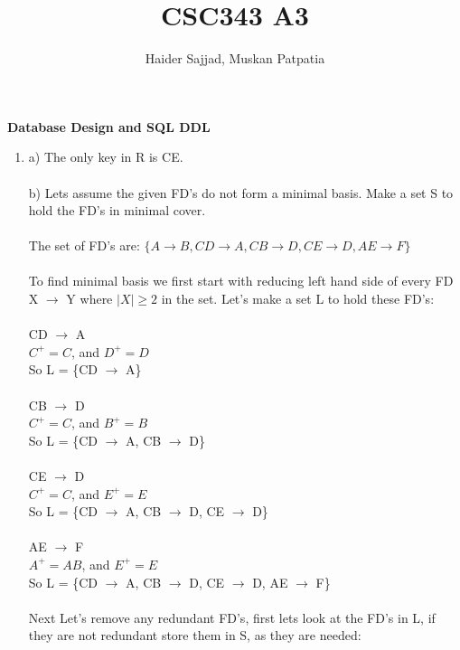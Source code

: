 \documentclass{article}
\begin{document}
\title{CSC343 A3}
\author{Haider Sajjad, Muskan Patpatia}
\maketitle

\begin{LARGE}
\textbf{Database Design and SQL DDL}
\end{LARGE}



\begin{enumerate}
    \item %
    a)
    The only key in R is CE.
       \\ \\
    b)
    Lets assume the given FD’s do not form a minimal basis. Make a set S to hold the FD's in minimal cover.
    \\ \\
    The set of FD's are: 
    $\{A\rightarrow B, CD\rightarrow A, CB\rightarrow D, CE\rightarrow D, AE\rightarrow F \}$
    \\  \\
    To find minimal basis we first start with 
    reducing left hand side of every FD X $\rightarrow$ Y where $|X|\geq 2$ in the set. Let's make a set L to hold these FD's:
    \\
    \\
    CD $\rightarrow$ A\\
    $C^{+}=C$, and $D^{+}=D$\\
    So L = \{CD $\rightarrow$ A\}
    \\
    \\
    CB $\rightarrow$ D\\
    $C^{+}=C$, and $B^{+}=B$\\
    So L = \{CD $\rightarrow$ A, CB $\rightarrow$ D\}\\\\
    CE $\rightarrow$ D\\
    $C^{+}=C$, and $E^{+}=E$\\
    So L = \{CD $\rightarrow$ A, CB $\rightarrow$ D, CE $\rightarrow$ D\}\\\\
    AE $\rightarrow$ F\\
    $A^{+}=AB$, and $E^{+}=E$\\
    So L = \{CD $\rightarrow$ A, CB $\rightarrow$ D, CE $\rightarrow$ D,  AE $\rightarrow$ F\}\\\\
    Next Let's remove any redundant FD's, first lets look at the FD's in L, if they are not redundant store them in S, as they are needed:\\\\

\end{enumerate}
\end{document}

